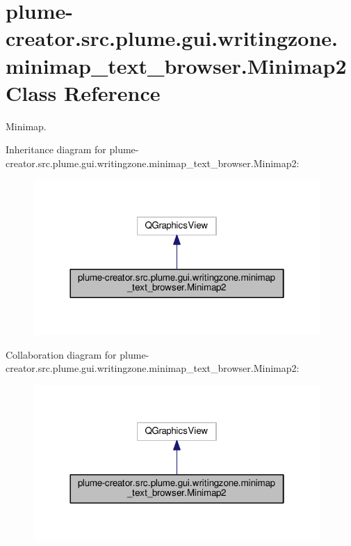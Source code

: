 \hypertarget{classplume-creator_1_1src_1_1plume_1_1gui_1_1writingzone_1_1minimap__text__browser_1_1_minimap2}{}\section{plume-\/creator.src.\+plume.\+gui.\+writingzone.\+minimap\+\_\+text\+\_\+browser.\+Minimap2 Class Reference}
\label{classplume-creator_1_1src_1_1plume_1_1gui_1_1writingzone_1_1minimap__text__browser_1_1_minimap2}


Minimap.  




Inheritance diagram for plume-\/creator.src.\+plume.\+gui.\+writingzone.\+minimap\+\_\+text\+\_\+browser.\+Minimap2\+:\nopagebreak
\begin{figure}[H]
\begin{center}
\leavevmode
\includegraphics[width=310pt]{classplume-creator_1_1src_1_1plume_1_1gui_1_1writingzone_1_1minimap__text__browser_1_1_minimap2__inherit__graph}
\end{center}
\end{figure}


Collaboration diagram for plume-\/creator.src.\+plume.\+gui.\+writingzone.\+minimap\+\_\+text\+\_\+browser.\+Minimap2\+:\nopagebreak
\begin{figure}[H]
\begin{center}
\leavevmode
\includegraphics[width=310pt]{classplume-creator_1_1src_1_1plume_1_1gui_1_1writingzone_1_1minimap__text__browser_1_1_minimap2__coll__graph}
\end{center}
\end{figure}
